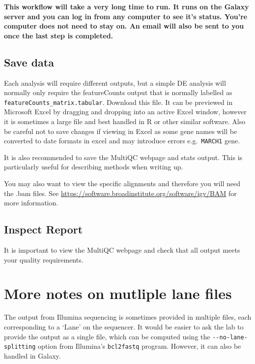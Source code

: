 \documentclass[
]{book}
\begin{document}
\textbf{This workflow will take a very long time to run. It runs on the Galaxy server and you can log in from any computer to see it's status. You're computer does not need to stay on. An email will also be sent to you once the last step is completed.}

\hypertarget{save-data}{%
\section{Save data}\label{save-data}}

Each analysis will require different outputs, but a simple DE analysis will normally only require the featureCounts output that is normally labelled as \texttt{featureCounts\_matrix.tabular}. Download this file. It can be previewed in Microsoft Excel by dragging and dropping into an active Excel window, however it is sometimes a large file and best handled in R or other similar software. Also be careful not to save changes if viewing in Excel as some gene names will be converted to date formats in excel and may introduce errors e.g.~\texttt{MARCH1} gene.

It is also recommended to save the MultiQC webpage and stats output. This is particularly useful for describing methods when writing up.

You may also want to view the specific alignments and therefore you will need the .bam files. See \url{https://software.broadinstitute.org/software/igv/BAM} for more information.

\hypertarget{inspect-report}{%
\section{Inspect Report}\label{inspect-report}}

It is important to view the MultiQC webpage and check that all output meets your quality requirements.

\hypertarget{multiple-lane-files}{%
\chapter{More notes on mutliple lane files}\label{multiple-lane-files}}

The output from Illumina sequencing is sometimes provided in multiple files, each corresponding to a `Lane' on the sequencer. It would be easier to ask the lab to provide the output as a single file, which can be computed using the \texttt{-\/-no-lane-splitting} option from Illumina's \texttt{bcl2fastq} program. However, it can also be handled in Galaxy.
\end{document}
